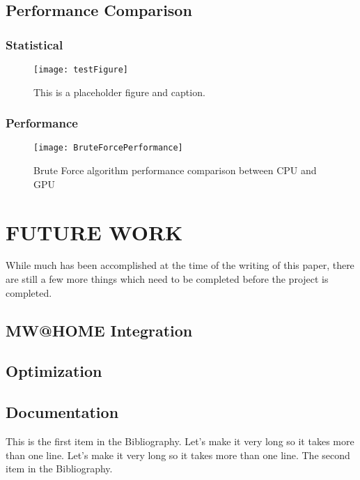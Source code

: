\documentclass{thesis}
\begin{document}
\section{Performance Comparison}
\subsection{Statistical}
\begin{figure}[h]
    \caption{This is a placeholder figure and caption.}
    \label{fig:test}
    \centering
    \texttt{[image: testFigure]}
\end{figure}
\subsection{Performance}
\begin{figure}[h]
    \caption{Brute Force algorithm performance comparison between CPU and GPU}
    \label{fig:BruteForcePerformance}
    \centering
    \texttt{[image: BruteForcePerformance]}
\end{figure}

\chapter{FUTURE WORK}
While much has been accomplished at the time of the writing of this paper, there are still a few more things which need to be completed before the project is completed.

\section{MW@HOME Integration}
\section{Optimization}
\section{Documentation}

\begin{singlespace}
\begin{thebibliography}{99}
 This is the first item in the Bibliography.
Let's make it very long so it takes more than one line.
Let's make it very long so it takes more than one line.
 The second item in the Bibliography.
\end{thebibliography}
\end{singlespace}
\end{document}
